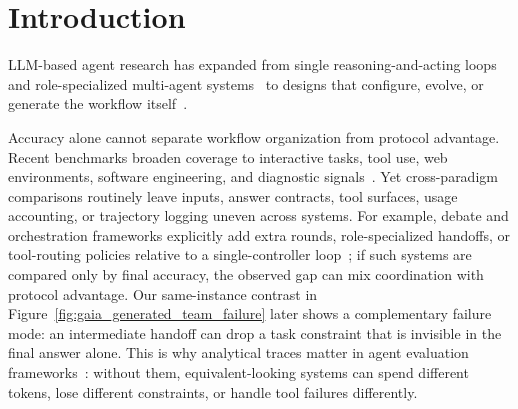 \begin{abstract}
    Does adding more agents help an LLM workflow once compared systems share the same benchmark loader, tool access, answer contract, usage accounting, and trajectory logging?
    We introduce BenchAgent, an evaluation framework that places single-agent, fixed multi-agent (MAS), and evolving MAS workflows under one normalized execution and logging protocol.
    BenchAgent evaluates these substrate-internal workflows across ten reasoning, coding, and tool-use benchmarks with GPT-4.1, and separately reports a Protocol-Aligned External (PAE) GAIA study of a runtime-generated workflow.
    Under SI conditions, at most one of six tested MAS exceeds the matched single-agent anchor on benchmark-balanced average accuracy---EvoAgent lies within the Wilson one-run guidance---while the remaining five trail by 2.56--11.29 points and occupy more expensive accuracy--cost trade-offs.
    On the PAE GAIA snapshot, a Claude-Code-style runtime workflow reaches 66.72\% overall and 69.23\% on Level~3, more than 20 points above the strongest non-Claude baseline (Jarvis, a fixed MAS).
\end{abstract}


\setlength{\parskip}{1.5pt plus1.5pt minus0pt}


\section{Introduction}
\label{sec:introduction}
LLM-based agent research has expanded from single reasoning-and-acting loops~\citep{yao2022react,schick2023toolformer,nakano2021webgpt,yang2024sweagent} and role-specialized multi-agent systems~\citep{li2023camel,wu2023autogen,hong2023metagpt} to designs that configure, evolve, or generate the workflow itself~\citep{chen2023agentverse,yuan2024evoagent,hu2024adas,zhang2024aflow,fourney2024magenticone}.

Accuracy alone cannot separate workflow organization from protocol advantage.
Recent benchmarks broaden coverage to interactive tasks, tool use, web environments, software engineering, and diagnostic signals~\citep{liu2023agentbench,mialon2023gaia,ma2024agentboard,zhou2023webarena,jimenez2024swebench,qin2023toolbench}.
Yet cross-paradigm comparisons routinely leave inputs, answer contracts, tool surfaces, usage accounting, or trajectory logging uneven across systems.
For example, debate and orchestration frameworks explicitly add extra rounds, role-specialized handoffs, or tool-routing policies relative to a single-controller loop~\citep{du2023multiagentdebate,wu2023autogen,shen2023hugginggpt}; if such systems are compared only by final accuracy, the observed gap can mix coordination with protocol advantage.
Our same-instance contrast in Figure~\ref{fig:gaia_generated_team_failure} later shows a complementary failure mode: an intermediate handoff can drop a task constraint that is invisible in the final answer alone.
This is why analytical traces matter in agent evaluation frameworks~\citep{ma2024agentboard,harbor_framework}: without them, equivalent-looking systems can spend different tokens, lose different constraints, or handle tool failures differently.

